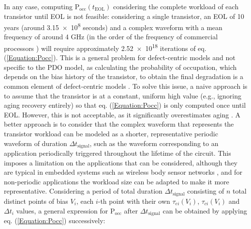 In any case, computing $\text{P}_{\text{occ}}(t_\text{EOL})$ considering the complete workload of each transistor until EOL is not feasible: considering a single transistor, an EOL of 10 years (around \num{3.15e+8} seconds) and a complex waveform with a mean frequency of around 4 GHz (in the order of the frequency of commercial processors \cite{AMDRyzenProcessors}) will require approximately \num{2.52e+18} iterations of eq. (\ref{Equation:Pocc}). This is a general problem for defect-centric models and not specific to the PDO model, as calculating the probability of occupation, which depends on the bias history of the transistor, to obtain the final degradation is a common element of defect-centric models \cite{grasserParadigmShiftUnderstanding2011, reisingerUnderstandingModelingAC2011, kaczerDefectcentricPerspectiveDevice2015}. To solve this issue, a naive approach is to assume that the transistor is at a constant, uniform high value (e.g., ignoring aging recovery entirely) so that eq. (\ref{Equation:Pocc}) is only computed once until EOL. However, this is not acceptable, as it significantly overestimates aging \cite{vansantenModelingMitigatingTimeDependent2019}. 
A better approach is to consider that the complex waveform that represents the transistor workload can be modeled as a shorter, representative periodic waveform of duration $\Delta t_{\text{signal}}$, such as the waveform corresponding to an application periodically triggered throughout the lifetime of the circuit. This imposes a limitation on the applications that can be considered, although they are typical in embedded systems \cite{amrouchConnectingPhysicalApplication2015} such as wireless body sensor networks \cite{duchAnalysisFunctionalErrors2020}, and for non-periodic applications the workload size can be adapted to make it more representative. Considering a period of total duration $\Delta t_\text{signal}$ consisting of $n$ total distinct points of bias $V_i$, each $i$-th point with their own $\tau_{ei}(V_i)$, $\tau_{ci}(V_i)$ and $\Delta t_i$ values, a general expression for $\text{P}_{\text{occ}}$ after $\Delta t_\text{signal}$ can be obtained by applying eq. (\ref{Equation:Pocc}) successively: 

